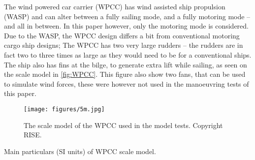 The wind powered car carrier (WPCC) has wind assisted ship propulsion (WASP) and can alter between a fully sailing mode, and a fully motoring mode -- and all in between. 
In this paper however, only the motoring mode is considered. Due to the WASP, the WPCC design differs a bit from conventional motoring cargo ship designs; The WPCC has two very large rudders -- the rudders are in fact two to three times as large as they would need to be for a conventional ships. The ship also has fins at the bilge, to generate extra lift while sailing, as seen on the scale model in \autoref{fig:WPCC}. This figure also show two fans, that can be used to simulate wind forces, these were however not used in the manoeuvring tests of this paper.
\begin{figure}[h]
    \centering
    \texttt{[image: figures/5m.jpg]}
    \caption{The scale model of the WPCC used in the model tests. Copyright RISE.}
    \label{fig:WPCC}
\end{figure}
\begin{table}[h]
    \centering
    \caption{Main particulars (SI units) of WPCC scale model.}
    \label{tab:other_parameters}
\end{table}